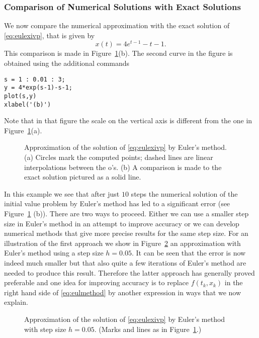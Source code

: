 \documentclass{ximera}
\begin{document}
\subsubsection*{Comparison of Numerical Solutions with Exact Solutions}

We now compare the numerical approximation with the exact solution 
of \eqref{eq:eulexivp}, that is given by
\[
x(t) = 4e^{t-1}-t-1.
\]
This comparison is made in Figure~\ref{fig:eulex1}(b).  The second
curve in the figure is obtained using the additional commands
\begin{verbatim}
s = 1 : 0.01 : 3;
y = 4*exp(s-1)-s-1;  
plot(s,y)        
xlabel('(b)')
\end{verbatim}
Note that in that figure the scale on the vertical axis is
different from the one in Figure~\ref{fig:eulex1}(a).
\begin{figure}[htb]
   \centerline{%
   }
   \caption{Approximation of the solution of 
   \protect\eqref{eq:eulexivp} by Euler's method.  
   (a) Circles mark the computed points; dashed lines 
    are linear interpolations between the o's.  (b)  A comparison is 
    made to the exact solution pictured as a solid line.}
   \label{fig:eulex1}
\end{figure}


In this example we see that after just $10$ steps the numerical solution 
of the initial value problem 
by Euler's method has led to a significant 
error (see Figure~\ref{fig:eulex1} (b)).  There are two ways to proceed.
Either we can use a smaller step size in 
Euler's method in an attempt to 
improve accuracy or we can develop numerical methods that give more 
precise results for the same step size. For an illustration of the
first approach we show in Figure~\ref{fig:eulimpr}
an approximation with Euler's method using a step size
$h=0.05$.  It can be seen that the error is now indeed much smaller
but that also quite a few iterations of Euler's method are needed 
to produce this result.  Therefore the latter approach has 
generally proved preferable and one idea for improving accuracy is 
to replace $f(t_k,x_k)$ in the right hand side of 
\eqref{eq:eulmethod} by another expression in ways that we now explain.
\begin{figure}[htb]
   \centerline{%
   }
   \caption{Approximation of the solution of
   \protect\eqref{eq:eulexivp} by Euler's method with step size
   $h=0.05$.  (Marks and lines as in Figure~\protect\ref{fig:eulex1}.)}
   \label{fig:eulimpr}
\end{figure}
\end{document}
